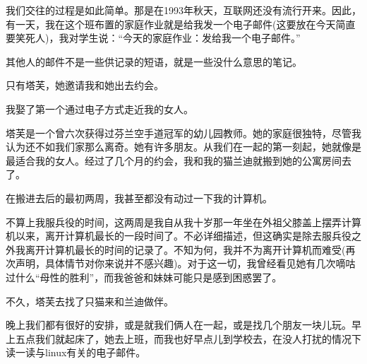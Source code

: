 我们交往的过程是如此简单。那是在1993年秋天，互联网还没有流行开来。因此，有一天，我在这个班布置的家庭作业就是给我发一个电子邮件(这要放在今天简直要笑死人)，我对学生说：“今天的家庭作业：发给我一个电子邮件。”

其他人的邮件不是一些供记录的短语，就是一些没什么意思的笔记。

只有塔芙，她邀请我和她出去约会。

我娶了第一个通过电子方式走近我的女人。

塔芙是一个曾六次获得过芬兰空手道冠军的幼儿园教师。她的家庭很独特，尽管我认为还不如我们家那么离奇。她有许多朋友。从我们在一起的第一刻起，她就像是最适合我的女人。经过了几个月的约会，我和我的猫兰迪就搬到她的公寓房间去了。

在搬进去后的最初两周，我甚至都没有动过一下我的计算机。

不算上我服兵役的时间，这两周是我自从我十岁那一年坐在外祖父膝盖上摆弄计算机以来，离开计算机最长的一段时间了。不必详细描述，但这确实是除去服兵役之外我离开计算机最长的时间的记录了。不知为何，我并不为离开计算机而难受(再次声明，具体情节对你来说并不感兴趣)。对于这一切，我曾经看见她有几次嘀咕过什么“母性的胜利”，而我爸爸和妹妹可能只是感到困惑罢了。

不久，塔芙去找了只猫来和兰迪做伴。

晚上我们都有很好的安排，或是就我们俩人在一起，或是找几个朋友一块儿玩。早上五点我们就起床了，她去上班，而我也好早点儿到学校去，在没人打扰的情况下读一读与linux有关的电子邮件。
